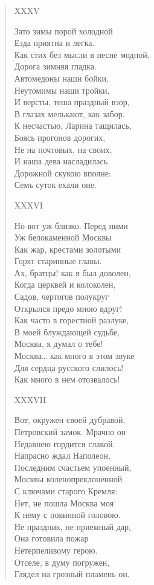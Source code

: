 \begin{verse}
XXXV

Зато зимы порой холодной\\
Езда приятна и легка.\\
Как стих без мысли в песне модной,\\
Дорога зимняя гладка.\\
Автомедоны наши бойки,\\
Неутомимы наши тройки,\\
И версты, теша праздный взор,\\
В глазах мелькают, как забор.\\
К несчастью, Ларина тащилась,\\
Боясь прогонов дорогих,\\
Не на почтовых, на своих,\\
И наша дева насладилась\\
Дорожной скукою вполне:\\
Семь суток ехали оне.

XXXVI

Но вот уж близко. Перед ними\\
Уж белокаменной Москвы\\
Как жар, крестами золотыми\\
Горят старинные главы.\\
Ах, братцы! как я был доволен,\\
Когда церквей и колоколен,\\
Садов, чертогов полукруг\\
Открылся предо мною вдруг!\\
Как часто в горестной разлуке,\\
В моей блуждающей судьбе,\\
Москва, я думал о тебе!\\
Москва… как много в этом звуке\\
Для сердца русского слилось!\\
Как много в нем отозвалось!

XXXVII

Вот, окружен своей дубравой,\\
Петровский замок. Мрачно он\\
Недавнею гордится славой.\\
Напрасно ждал Наполеон,\\
Последним счастьем упоенный,\\
Москвы коленопреклоненной\\
С ключами старого Кремля:\\
Нет, не пошла Москва моя\\
К нему с повинной головою.\\
Не праздник, не приемный дар,\\
Она готовила пожар\\
Нетерпеливому герою.\\
Отселе, в думу погружен,\\
Глядел на грозный пламень он.


\end{verse}
